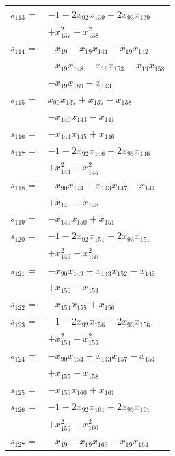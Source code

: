 \begin{longtable}{@{}r@{\;}l@{}}
\(s_{113}=\) & \(\displaystyle -1 -2x_{92}x_{139} -2x_{93}x_{139}\) \\
 & \(\displaystyle +x_{137}^{2} +x_{138}^{2}\) \\[3pt]
\(s_{114}=\) & \(\displaystyle -x_{19} -x_{19}x_{141} -x_{19}x_{142}\) \\
 & \(\displaystyle -x_{19}x_{148} -x_{19}x_{153} -x_{19}x_{158}\) \\
 & \(\displaystyle -x_{19}x_{189} +x_{143}\) \\[3pt]
\(s_{115}=\) & \(\displaystyle x_{90}x_{137} +x_{137} -x_{138}\) \\
 & \(\displaystyle -x_{140}x_{143} -x_{141}\) \\[3pt]
\(s_{116}=\) & \(\displaystyle -x_{144}x_{145} +x_{146}\) \\[3pt]
\(s_{117}=\) & \(\displaystyle -1 -2x_{92}x_{146} -2x_{93}x_{146}\) \\
 & \(\displaystyle +x_{144}^{2} +x_{145}^{2}\) \\[3pt]
\(s_{118}=\) & \(\displaystyle -x_{90}x_{144} +x_{143}x_{147} -x_{144}\) \\
 & \(\displaystyle +x_{145} +x_{148}\) \\[3pt]
\(s_{119}=\) & \(\displaystyle -x_{149}x_{150} +x_{151}\) \\[3pt]
\(s_{120}=\) & \(\displaystyle -1 -2x_{92}x_{151} -2x_{93}x_{151}\) \\
 & \(\displaystyle +x_{149}^{2} +x_{150}^{2}\) \\[3pt]
\(s_{121}=\) & \(\displaystyle -x_{90}x_{149} +x_{143}x_{152} -x_{149}\) \\
 & \(\displaystyle +x_{150} +x_{153}\) \\[3pt]
\(s_{122}=\) & \(\displaystyle -x_{154}x_{155} +x_{156}\) \\[3pt]
\(s_{123}=\) & \(\displaystyle -1 -2x_{92}x_{156} -2x_{93}x_{156}\) \\
 & \(\displaystyle +x_{154}^{2} +x_{155}^{2}\) \\[3pt]
\(s_{124}=\) & \(\displaystyle -x_{90}x_{154} +x_{143}x_{157} -x_{154}\) \\
 & \(\displaystyle +x_{155} +x_{158}\) \\[3pt]
\(s_{125}=\) & \(\displaystyle -x_{159}x_{160} +x_{161}\) \\[3pt]
\(s_{126}=\) & \(\displaystyle -1 -2x_{92}x_{161} -2x_{93}x_{161}\) \\
 & \(\displaystyle +x_{159}^{2} +x_{160}^{2}\) \\[3pt]
\(s_{127}=\) & \(\displaystyle -x_{19} -x_{19}x_{163} -x_{19}x_{164}\) \\

\end{longtable}
